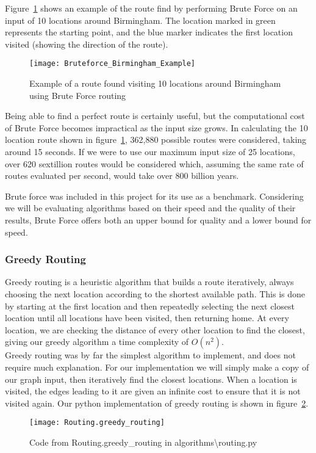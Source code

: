 \noindent
Figure~\ref{fig:Bruteforce_Birmingham_Example} shows an example of the route find by performing Brute Force on an input
of 10 locations around Birmingham.
The location marked in green represents the starting point, and the blue marker indicates the first location
visited (showing the direction of the route).
\begin{figure}[H]
    \centering
    \texttt{[image: Bruteforce\_Birmingham\_Example]}
    \caption{Example of a route found visiting 10 locations around Birmingham using Brute Force routing}
    \label{fig:Bruteforce_Birmingham_Example}
\end{figure}

\noindent
Being able to find a perfect route is certainly useful, but the computational cost of Brute Force becomes
impractical as the input size grows.
In calculating the 10 location route shown in figure~\ref{fig:Bruteforce_Birmingham_Example}, 362,880 possible routes
were considered, taking around 15 seconds.
If we were to use our maximum input size of 25 locations, over 620 sextillion routes would be considered \textemdash
which, assuming the same rate of routes evaluated per second, would take over 800 billion years.

Brute force was included in this project for its use as a benchmark.
Considering we will be evaluating algorithms based on their speed and the quality of their results, Brute Force offers
both an upper bound for quality and a lower bound for speed.

\subsubsection{Greedy Routing}\label{subsubsec:greedy-routing}
Greedy routing is a heuristic algorithm that builds a route iteratively, always choosing the next location according
to the shortest available path.
This is done by starting at the first location and then repeatedly selecting the next closest location until all
locations have been visited, then returning home.
At every location, we are checking the distance of every other location to find the closest, giving our greedy
algorithm a time complexity of $O(n^2)$.\\

\noindent
Greedy routing was by far the simplest algorithm to implement, and does not require much explanation.
For our implementation we will simply make a copy of our graph input, then iteratively find the closest locations.
When a location is visited, the edges leading to it are given an infinite cost to ensure that it is not visited again.
Our python implementation of greedy routing is shown in figure~\ref{fig:Routing.greedy_routing}.
\begin{figure}[H]
    \centering
    \texttt{[image: Routing.greedy\_routing]}
    \caption{Code from Routing.greedy\_routing in algorithms\textbackslash routing.py}
    \label{fig:Routing.greedy_routing}
\end{figure}

